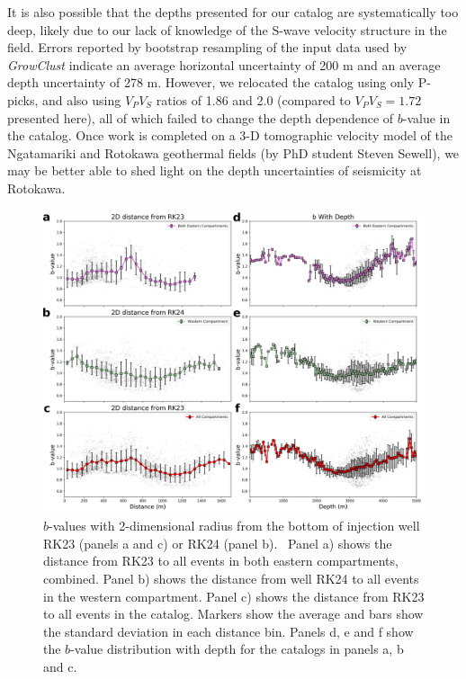 It is also possible that the depths presented for our catalog are systematically too deep, likely due to our lack of knowledge of the S-wave velocity structure in the field. Errors reported by bootstrap resampling of the input data used by \textit{GrowClust} indicate an average horizontal uncertainty of 200 m and an average depth uncertainty of 278 m. However, we relocated the catalog using only P-picks, and also using $V_{P}V_{S}$ ratios of 1.86 and 2.0 (compared to $V_{P}V_{S}=1.72$ presented here), all of which failed to change the depth dependence of $b$-value in the catalog. Once work is completed on a 3-D tomographic velocity model of the Ngatamariki and Rotokawa geothermal fields (by PhD student Steven Sewell), we may be better able to shed light on the depth uncertainties of seismicity at Rotokawa.

\begin{figure}[h!]
\begin{center}
\includegraphics[width=0.98\columnwidth]{Chapter_4_Rot/figures/Rot_bval_w_radius_2D_RK23_min100_max300/Rot_bvalues_2D-depth_plots_2-17_labels}
\caption[Rotokawa $b$-value profiles with depth and event-well radius]{{
$b$-values with 2-dimensional radius from the bottom of injection well
RK23 (panels a and c) or RK24 (panel b).~ Panel a) shows the distance
from RK23 to all events in both eastern compartments, combined. Panel b)
shows the distance from well RK24 to all events in the western
compartment. Panel c) shows the distance from RK23 to all events in the
catalog. Markers show the average and bars show the standard deviation
in each distance bin. Panels d, e and f show the $b$-value distribution
with depth for the catalogs in panels a, b and c.
{\label{922043}}%
}}
\end{center}
\end{figure}

